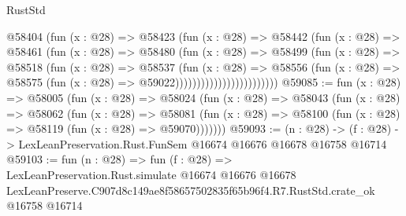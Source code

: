 \begin{lexlean}{RustStd}
\begin{coremodule}
                              @58404
                                (fun (x : @28) =>
                                @58423
                                  (fun (x : @28) =>
                                  @58442
                                    (fun (x : @28) =>
                                    @58461
                                      (fun (x : @28) =>
                                      @58480
                                        (fun (x : @28) =>
                                        @58499
                                          (fun (x : @28) =>
                                          @58518
                                            (fun (x : @28) =>
                                            @58537
                                              (fun (x : @28) =>
                                              @58556
                                                (fun (x : @28) =>
                                                @58575
                                                  (fun (x : @28) => @59022))))))))))))))))))))))))
@59085 := fun (x : @28) =>
  @58005
    (fun (x : @28) =>
    @58024
      (fun (x : @28) =>
      @58043
        (fun (x : @28) =>
        @58062
          (fun (x : @28) =>
          @58081 (fun (x : @28) => @58100 (fun (x : @28) => @58119 (fun (x : @28) => @59070)))))))
@59093 := (n : @28) ->
  (f : @28) -> LexLeanPreservation.Rust.FunSem @16674 @16676 @16678 @16758 @16714
@59103 := fun (n : @28) =>
  fun (f : @28) =>
  LexLeanPreservation.Rust.simulate
    @16674
    @16676
    @16678
    LexLeanPreserve.C907d8c149ae8f58657502835f65b96f4.R7.RustStd.crate_ok
    @16758
    @16714
\end{coremodule}
\end{lexlean}
